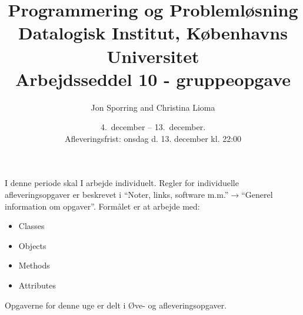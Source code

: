 \documentclass[a4paper,12pt]{article}
\title{Programmering og Problemløsning\\Datalogisk Institut,
  Københavns Universitet\\Arbejdsseddel 10 - gruppeopgave}
\author{Jon Sporring and Christina Lioma}
\date{4.\ december -- 13.\ december.\\Afleveringsfrist: onsdag d. 13. december kl. 22:00}
\begin{document}
\maketitle

I denne periode skal I arbejde individuelt. Regler for individuelle afleveringsopgaver er beskrevet i "`Noter, links, software m.m."'$\rightarrow$"`Generel information om opgaver"'. Formålet er at arbejde med:
\begin{itemize}
\item Classes
\item Objects
\item Methods
\item Attributes
\end{itemize}

Opgaverne for denne uge er delt i Øve- og afleveringsopgaver. 
\end{document}
